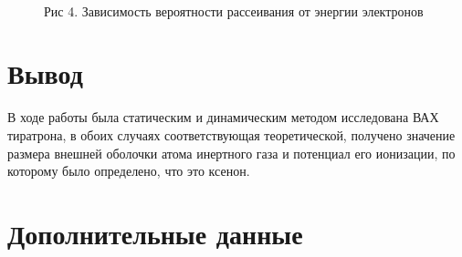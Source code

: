 \documentclass[12pt]{article}
\begin{document}
      \begin{figure}[h!]
        \\
        Рис 4. Зависимость вероятности рассеивания от энергии электронов
        \label{fig:oscillograme}
      \end{figure}

    \section{Вывод}
      В ходе работы была статическим и динамическим методом исследована ВАХ
      тиратрона, в обоих случаях соответствующая теоретической, получено
      значение размера внешней оболочки атома инертного газа и потенциал его
      ионизации, по которому было определено, что это ксенон.

    \newpage
    \section{Дополнительные данные}
\end{document}
